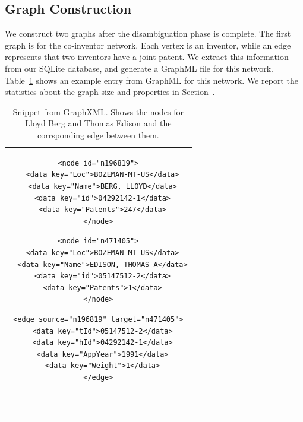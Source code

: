 \subsection{Graph Construction}

We construct two graphs after the disambiguation phase is complete. 
The first graph is for the co-inventor network. 
Each vertex is an inventor, while an edge represents that two inventors have a joint patent. 
We extract this information from our SQLite database, and generate a GraphML file for this network.
Table~\ref{listing} shows an example entry from GraphML for this network.
We report the statistics about the graph size and properties in Section~\cite{sec:eval}.

\begin{table}[h] 
  \centering
  \begin{tabular}{@{}c@{}} 

  \begin{minipage}{0.25\linewidth}

\begin{lstlisting}[]
<node id="n196819">
  <data key="Loc">BOZEMAN-MT-US</data>
  <data key="Name">BERG, LLOYD</data>
  <data key="id">04292142-1</data>
  <data key="Patents">247</data>
</node>
\end{lstlisting}

  \end{minipage}
  \hspace{0.05\linewidth}
  \begin{minipage}{0.3\linewidth}

\begin{lstlisting}[]
<node id="n471405">
  <data key="Loc">BOZEMAN-MT-US</data>
  <data key="Name">EDISON, THOMAS A</data>
  <data key="id">05147512-2</data>
  <data key="Patents">1</data>
</node>
\end{lstlisting}

  \end{minipage}
  \hspace{0.05\linewidth}
  \begin{minipage}{0.3\linewidth}

\begin{lstlisting}[]
<edge source="n196819" target="n471405">
  <data key="tId">05147512-2</data>
  <data key="hId">04292142-1</data>
  <data key="AppYear">1991</data>
  <data key="Weight">1</data>
</edge>



\end{lstlisting}

  \end{minipage}
  
  \end{tabular}

\label{listing}
\caption{\footnotesize Snippet from GraphXML. Shows the nodes for Lloyd Berg and Thomas Edison and the corrsponding edge between them.}
\end{table}


